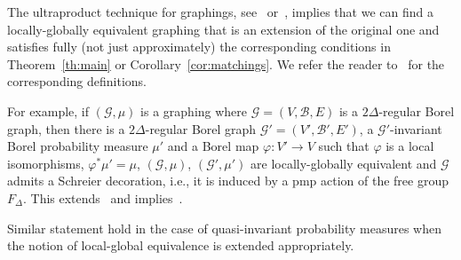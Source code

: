 \documentclass[10pt]{amsart}
\theoremstyle{definition}
\newcommand{\clG}{\mathcal{G}}
\newcommand{\clB}{\mathcal{B}}
\begin{document}
The ultraproduct technique for graphings, see~\cite{Elek} or~\cite{KecConleyT-D}, implies that we can find a locally-globally equivalent graphing that is an extension of the original one and satisfies fully (not just approximately) the corresponding conditions in Theorem~\ref{th:main} or Corollary~\ref{cor:matchings}. We refer the reader to~\cite[Chapter~19]{Lovasz} for the corresponding definitions.

For example, if $(\clG,\mu)$ is a graphing where $\clG=(V,\clB,E)$ is a $2\Delta$-regular Borel graph, then there is a $2\Delta$-regular Borel graph $\clG'=(V',\clB',E')$, a $\clG'$-invariant Borel probability measure $\mu'$ and a Borel map $\varphi:V'\to V$ such that $\varphi$ is a local isomorphisms, $\varphi^*\mu'=\mu$, $(\clG,\mu)$, $(\clG',\mu')$ are locally-globally equivalent and $\clG$ admits a Schreier decoration, i.e., it is induced by a pmp action of the free group $F_{\Delta}$. This extends~\cite[Corollary~4]{Laszlo} and implies~\cite[Theorem~1]{Laszlo}.

Similar statement hold in the case of quasi-invariant probability measures when the notion of local-global equivalence is extended appropriately.

\vspace{20pt}
\end{document}
